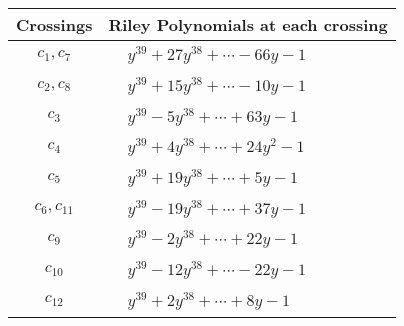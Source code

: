 \documentclass[1p]{elsarticle_modified}
\theoremstyle{definition}
\begin{document}
\begin{tabular}{m{50pt}|m{274pt}}
Crossings & \hspace{64pt}Riley Polynomials at each crossing \\
\hline $$\begin{aligned}c_{1},c_{7}\end{aligned}$$&$\begin{aligned}
&y^{39}+27 y^{38}+\cdots-66 y-1
\end{aligned}$\\
\hline $$\begin{aligned}c_{2},c_{8}\end{aligned}$$&$\begin{aligned}
&y^{39}+15 y^{38}+\cdots-10 y-1
\end{aligned}$\\
\hline $$\begin{aligned}c_{3}\end{aligned}$$&$\begin{aligned}
&y^{39}-5 y^{38}+\cdots+63 y-1
\end{aligned}$\\
\hline $$\begin{aligned}c_{4}\end{aligned}$$&$\begin{aligned}
&y^{39}+4 y^{38}+\cdots+24 y^2-1
\end{aligned}$\\
\hline $$\begin{aligned}c_{5}\end{aligned}$$&$\begin{aligned}
&y^{39}+19 y^{38}+\cdots+5 y-1
\end{aligned}$\\
\hline $$\begin{aligned}c_{6},c_{11}\end{aligned}$$&$\begin{aligned}
&y^{39}-19 y^{38}+\cdots+37 y-1
\end{aligned}$\\
\hline $$\begin{aligned}c_{9}\end{aligned}$$&$\begin{aligned}
&y^{39}-2 y^{38}+\cdots+22 y-1
\end{aligned}$\\
\hline $$\begin{aligned}c_{10}\end{aligned}$$&$\begin{aligned}
&y^{39}-12 y^{38}+\cdots-22 y-1
\end{aligned}$\\
\hline $$\begin{aligned}c_{12}\end{aligned}$$&$\begin{aligned}
&y^{39}+2 y^{38}+\cdots+8 y-1
\end{aligned}$\\
\hline
\end{tabular}\\~\\
\end{document}
